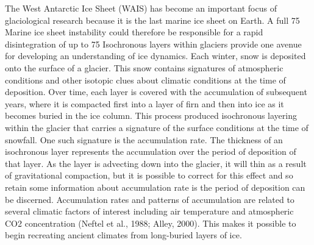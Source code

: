 \documentclass[draft,jgrga]{agutex}
\begin{document}
The West Antarctic Ice Sheet (WAIS) has become an important focus of glaciological research because it is the last marine ice sheet on Earth. A full 75%
	Marine ice sheet instability could therefore be responsible for a rapid disintegration of up to 75%
	Isochronous layers within glaciers provide one avenue for developing an understanding of ice dynamics.  Each winter, snow is deposited onto the surface of a glacier. This snow contains signatures of atmospheric conditions and other isotopic clues about climatic conditions at the time of deposition. Over time, each layer is covered with the accumulation of subsequent years, where it is compacted first into a layer of firn and then into ice as it becomes buried in the ice column. This process produced isochronous layering within the glacier that carries a signature of the surface conditions at the time of snowfall.  
	One such signature is the accumulation rate.  The thickness of an isochronous layer represents the accumulation over the period of deposition of that layer. As the layer is advecting down into the glacier, it will thin as a result of gravitational compaction, but it is possible to correct for this effect and so retain some information about accumulation rate is the period of deposition can be discerned. Accumulation rates and patterns of accumulation are related to several climatic factors of interest including air temperature and atmospheric CO2 concentration (Neftel et al., 1988; Alley, 2000). This makes it possible to begin recreating ancient climates from long-buried layers of ice. 
\end{document}
